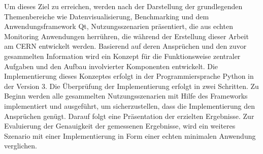 Um dieses Ziel zu erreichen, werden nach der Darstellung der grundlegenden
Themenbereiche wie Datenvisualisierung, Benchmarking und dem Anwendungsframework
Qt, Nutzungsszenarien präsentiert, die aus echten Monitoring Anwendungen
herrühren, die während der Erstellung dieser Arbeit am CERN entwickelt werden.
Basierend auf deren Ansprüchen und den zuvor gesammelten Information wird ein
Konzept für die Funktionsweise zentraler Aufgaben und den Aufbau involvierter
Komponenten entwickelt. Die Implementierung dieses Konzeptes erfolgt in der
Programmiersprache Python in der Version 3. Die Überprüfung der Implementierung
erfolgt in zwei Schritten. Zu Beginn werden alle gesammelten Nutzungsszenarien
mit Hilfe des Frameworks implementiert und ausgeführt, um sicherzustellen, dass
die Implementierung den Ansprüchen genügt. Darauf folgt eine Präsentation der
erzielten Ergebnisse. Zur Evaluierung der Genauigkeit der gemessenen Ergebnisse,
wird ein weiteres Szenario mit einer Implementierung in Form einer echten
minimalen Anwendung verglichen.
